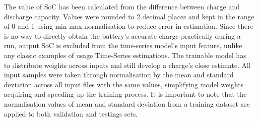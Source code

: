 %
%
The value of SoC has been calculated from the difference between charge and discharge capacity.
Values were rounded to 2 decimal places and kept in the range of 0 and 1 using min-max normalisation to reduce error in estimation.
Since there is no way to directly obtain the battery's accurate charge practically during a run, output SoC is excluded from the time-series model's input feature, unlike any classic examples of usage Time-Series estimations.
The trainable model has to distribute weights across inputs and still develop a charge's close estimate.
All input samples were taken through normalisation by the mean and standard deviation across all input files with the same values, simplifying model weights acquiring and speeding up the training process.
It is important to note that the normalisation values of mean and standard deviation from a training dataset are applied to both validation and testings sets.

